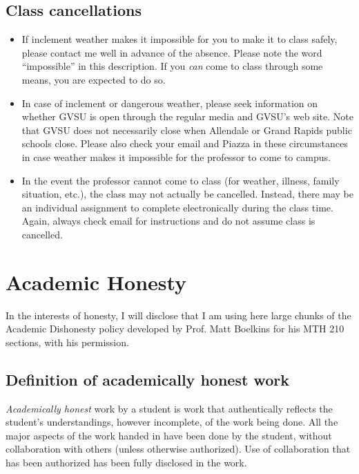 \documentclass[11pt]{article}
\begin{document}
\subsection{Class cancellations}

\begin{itemize}[itemsep=0pt]
	\item If inclement weather makes it impossible for you to make it to class safely, please contact me well in advance of the absence. Please note the word ``impossible'' in this description. If you \emph{can} come to class through some means, you are expected to do so.
	\item In case of inclement or dangerous weather, please seek information on whether GVSU is open through the regular media and GVSU's web site. Note that GVSU does not necessarily close when Allendale or Grand Rapids public schools close. Please also check your email and Piazza in these circumstances in case weather makes it impossible for the professor to come to campus. 
	\item In the event the professor cannot come to class (for weather, illness, family situation, etc.), the class may not actually be cancelled. Instead, there may be an individual assignment to complete electronically during the class time. Again, always check email for instructions and do not assume class is cancelled.
\end{itemize}


\section{Academic Honesty}

In the interests of honesty, I will disclose that I am using here large chunks of the Academic Dishonesty policy developed by Prof. Matt Boelkins for his MTH 210 sections, with his permission.

\subsection{Definition of academically honest work}

\emph{Academically honest} work by a student is work that authentically reflects the student's understandings, however incomplete, of the work being done. All the major aspects of the work handed in have been done by the student, without collaboration with others (unless otherwise authorized). Use of collaboration that has been authorized has been fully disclosed in the work. 
\end{document}
